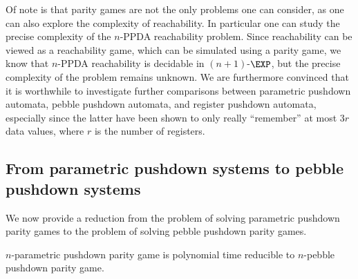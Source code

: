 \documentclass[a4paper,UKenglish,cleveref, autoref, thm-restate]{lipics-v2021}
\begin{document}
Of note is that parity games are 
not the only problems one can consider, as one can
also explore the complexity of reachability. 
In particular
one can 
study the precise complexity of the
{\sc $n$-PPDA reachability} problem.
Since reachability can be viewed as a reachability game, which can be simulated using a parity game, we know that
{\sc $n$-PPDA reachability} is decidable in $(n+1)$-$\EXP$, 
but the precise complexity of the problem remains unknown.
We are furthermore convinced that it is worthwhile to investigate further comparisons between parametric pushdown automata, pebble pushdown automata, 
and register pushdown automata, especially since the latter have been shown to only really ``remember'' at most  $3r$ data values, where $r$ is the number of registers. 








\appendix


\subsection{From parametric pushdown 
systems 
to pebble pushdown systems
}

We now provide a reduction from the problem of solving parametric pushdown parity games to the problem of solving pebble pushdown parity games. 


\begin{theorem}\label{PPDA reduction}
{\sc $n$-parametric pushdown parity game} 
is polynomial time reducible to
{\sc $n$-pebble pushdown parity game}.
\end{theorem}
\end{document}
